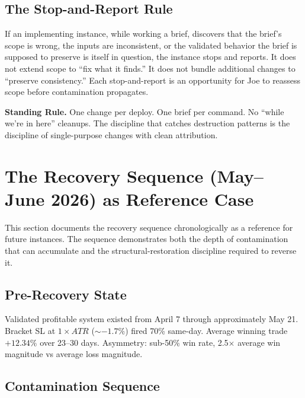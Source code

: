 \documentclass[11pt, a4paper]{article}
\newcommand{\rulebox}[1]{%
  \begin{framed}\noindent\textbf{Standing Rule.} #1\end{framed}}
\theoremstyle{definition}
\begin{document}
\subsection{The Stop-and-Report Rule}

If an implementing instance, while working a brief, discovers that the
brief's scope is wrong, the inputs are inconsistent, or the validated
behavior the brief is supposed to preserve is itself in question, the
instance stops and reports. It does not extend scope to ``fix what it
finds.'' It does not bundle additional changes to ``preserve consistency.''
Each stop-and-report is an opportunity for Joe to reassess scope before
contamination propagates.

\rulebox{One change per deploy. One brief per command. No ``while we're in
here'' cleanups. The discipline that catches destruction patterns is the
discipline of single-purpose changes with clean attribution.}

\section{The Recovery Sequence (May--June 2026) as Reference Case}

This section documents the recovery sequence chronologically as a reference
for future instances. The sequence demonstrates both the depth of
contamination that can accumulate and the structural-restoration discipline
required to reverse it.

\subsection{Pre-Recovery State}

Validated profitable system existed from April 7 through approximately
May 21. Bracket SL at $1\!\times\!ATR$ ($\sim-1.7\%$) fired 70\% same-day.
Average winning trade $+12.34\%$ over 23--30 days. Asymmetry: sub-50\% win
rate, 2.5$\times$ average win magnitude vs average loss magnitude.

\subsection{Contamination Sequence}
\end{document}
